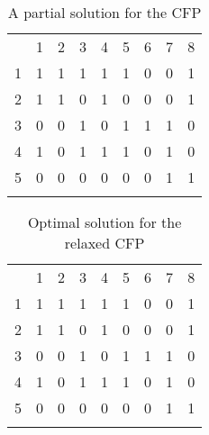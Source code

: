 \documentclass[citeauthoryear]{llncs}
\begin{document}
\begin{table}
\centering
        \begin{tabular}{ c|cccccccc|}
                  \multicolumn{1}{c}{~} & \multicolumn{1}{c}{1} & \multicolumn{1}{c}{2} & \multicolumn{1}{c}{3} & \multicolumn{1}{c}{4} & \multicolumn{1}{c}{5} & \multicolumn{1}{c}{6} & \multicolumn{1}{c}{7} & \multicolumn{1}{c}{8} \\
                   \hhline{~--------}
                  1 & \cellcolor{yellow}1  & \cellcolor{yellow}1 &\cellcolor{yellow}1 &\multicolumn{1}{c|}{\cellcolor{yellow}1} &\cellcolor{gray}1  &0 &0 &1\\
                  2 &\cellcolor{yellow}1 &\cellcolor{yellow}1 &\cellcolor{yellow}0 &\multicolumn{1}{c|}{\cellcolor{yellow}1} &\cellcolor{gray}0 &0 &0 &1\\
                   \hhline{~-----}
                  3 &\cellcolor{gray}0 &\cellcolor{gray}0 &\cellcolor{gray}1 &\cellcolor{gray}0 &\multicolumn{1}{|c|}{\cellcolor{green}1} &1 &1 &0\\
                   \hhline{~~~~~-}
                  4 &1 &0 &1 &1 &1 &0 &1 &0\\
                  5 &0 &0 &0 &0 &0 &0 &1 &1\\
                  \hhline{~--------}
        \end{tabular}
        \caption{A partial solution for the CFP}
\label{partial}
\end{table}

\begin{table}
\centering
        \begin{tabular}{ c|cccccccc|}
                  \multicolumn{1}{c}{~} & \multicolumn{1}{c}{1} & \multicolumn{1}{c}{2} & \multicolumn{1}{c}{3} & \multicolumn{1}{c}{4} & \multicolumn{1}{c}{5} & \multicolumn{1}{c}{6} & \multicolumn{1}{c}{7} & \multicolumn{1}{c}{8} \\
                   \hhline{~--------}
                  1 &\cellcolor{yellow}1  & \cellcolor{yellow}1 &\cellcolor{yellow}1 &\multicolumn{1}{c|}{\cellcolor{yellow}1} &1  &0 &0 &\cellcolor{yellow}1\\
                  2 &\cellcolor{yellow}1 &\cellcolor{yellow}1 &\cellcolor{yellow}0 &\multicolumn{1}{c|}{\cellcolor{yellow}1} &0 &0 &0 &\cellcolor{yellow}1\\
                   \hhline{~-----}
                  3 &0 &0 &1 &0 &\multicolumn{1}{|c|}{\cellcolor{green}1} &\cellcolor{green}1 &\cellcolor{green}1 &0\\
                  4 &\cellcolor{yellow}1 &\cellcolor{yellow}0 &\cellcolor{yellow}1 &\cellcolor{yellow}1 &1 &0 &\cellcolor{yellow}1 &0\\
                  5 &0 &0 &0 &0 &0 &0 &\cellcolor{red}1 &\cellcolor{red}1\\
                  \hhline{~--------}
        \end{tabular}
        \caption{Optimal solution for the relaxed CFP}
\label{relaxed}
\end{table}
\end{document}
